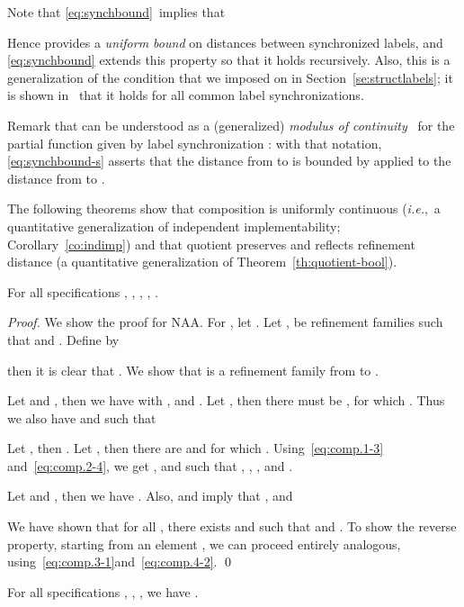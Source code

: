 \documentclass[twocolumn]{svjour3-dummy}
\newcommand*\ie{\textit{i.e.},}
\newcommand*\NAA{NAA\xspace}
\begin{document}
Note that \eqref{eq:synchbound}~implies that

Hence  provides a \emph{uniform bound} on distances between
synchronized labels, and \eqref{eq:synchbound} extends this property
so that it holds recursively.  Also, this is a generalization of the
condition that we imposed on  in Section~\ref{se:structlabels};
it is shown in~\cite[p.~18]{DBLP:journals/acta/FahrenbergL14} that it
holds for all common label synchronizations.

Remark that  can be understood as a (generalized) \emph{modulus of
  continuity}~\cite{encmath/continuity} for the partial function  given by label synchronization : with that notation, \eqref{eq:synchbound-s} asserts
that the distance from  to  is bounded by
 applied to the distance from  to .

The following theorems show that composition is uniformly continuous
(\ie~a quantitative generalization of independent implementability;
Corollary~\ref{co:indimp}) and that quotient preserves and reflects
refinement distance (a quantitative generalization of
Theorem~\ref{th:quotient-bool}).

\begin{theorem}\label{th:indimp-q}
  \quad For all specifications , , , , .
\end{theorem}

\begin{proof}We show the proof for \NAA.  For , let .  Let ,  be refinement families such that  and .  Define  by
  
  then it is clear that .  We
  show that  is a refinement family from  to .

  Let  and , then
  we have  with ,  and .  Let , then there must be ,  for which .  Thus we also have  and  such that
  

  Let , then .
  Let , then there are  and  for which .  Using~\eqref{eq:comp.1-3} and~\eqref{eq:comp.2-4}, we get ,  and 
  such that , , , and .

  Let  and , then we
  have .  Also,  and  imply that , and
  
  We have shown that for all , there
  exists  and  such
  that   and .  To show the reverse property,
  starting from an element , we can
  proceed entirely analogous,
  using~\eqref{eq:comp.3-1}\linebreak[4]and~\eqref{eq:comp.4-2}.  \qed
\end{proof}

\begin{theorem}
  \label{th:quot-q}
  For all specifications , , , we have .
\end{theorem}
\end{document}
